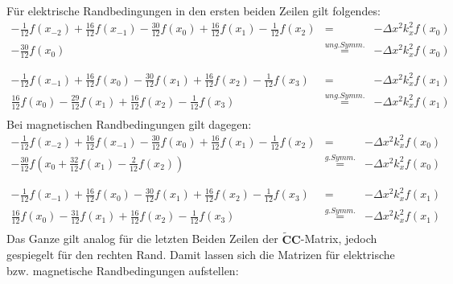 \documentclass[Protokollheft.tex]{subfiles}
\begin{document}
Für elektrische Randbedingungen in den ersten beiden Zeilen gilt folgendes:
\begin{eqnarray*}
-\frac{1}{12}f(x_{-2})+\frac{16}{12}f(x_{-1})-\frac{30}{12}f(x_0)+\frac{16}{12}f(x_{1})-\frac{1}{12}f(x_{2})&=&-\Delta x^2k^2_xf(x_0)\\
-\frac{30}{12}f(x_0)&\stackrel{ung. Symm.}{=}&-\Delta x^2k^2_xf(x_0)\\
\\
\\
-\frac{1}{12}f(x_{-1})+\frac{16}{12}f(x_{0})-\frac{30}{12}f(x_1)+\frac{16}{12}f(x_{2})-\frac{1}{12}f(x_{3})&=&-\Delta x^2k^2_xf(x_1)\\
\frac{16}{12}f(x_{0})-\frac{29}{12}f(x_1)+\frac{16}{12}f(x_{2})-\frac{1}{12}f(x_{3})&\stackrel{ung. Symm.}{=}&-\Delta x^2k^2_xf(x_1)\\
\end{eqnarray*}
Bei magnetischen Randbedingungen gilt dagegen:
\begin{eqnarray*}
	-\frac{1}{12}f(x_{-2})+\frac{16}{12}f(x_{-1})-\frac{30}{12}f(x_0)+\frac{16}{12}f(x_{1})-\frac{1}{12}f(x_{2})&=&-\Delta x^2k^2_xf(x_0)\\
	-\frac{30}{12}f(x_0+\frac{32}{12}f(x_{1})-\frac{2}{12}f(x_{2}))&\stackrel{g. Symm.}{=}&-\Delta x^2k^2_xf(x_0)\\
	\\
	\\
	-\frac{1}{12}f(x_{-1})+\frac{16}{12}f(x_{0})-\frac{30}{12}f(x_1)+\frac{16}{12}f(x_{2})-\frac{1}{12}f(x_{3})&=&-\Delta x^2k^2_xf(x_1)\\
	\frac{16}{12}f(x_{0})-\frac{31}{12}f(x_1)+\frac{16}{12}f(x_{2})-\frac{1}{12}f(x_{3})&\stackrel{g. Symm.}{=}&-\Delta x^2k^2_xf(x_1)\\
\end{eqnarray*}
Das Ganze gilt analog für die letzten Beiden Zeilen der $\mathbf{\widetilde{C}C}$-Matrix, jedoch gespiegelt für den rechten Rand.
Damit lassen sich die Matrizen für elektrische bzw. magnetische Randbedingungen aufstellen:
\end{document}
